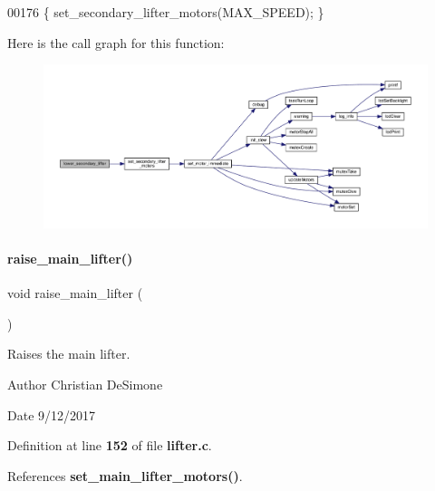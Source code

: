 \begin{DoxyCode}
00176 \{ set_secondary_lifter_motors(MAX\_SPEED); \}
\end{DoxyCode}
Here is the call graph for this function\+:
\nopagebreak
\begin{figure}[H]
\begin{center}
\leavevmode
\includegraphics[width=350pt]{lifter_8h_af76abbd394bf206ab56fa237d776f2b3_cgraph}
\end{center}
\end{figure}
\mbox{\label{lifter_8h_a2e2bd38b5b8b52378f3510368bf8aa0a}} 
\paragraph{raise\+\_\+main\+\_\+lifter()}
{\footnotesize\ttfamily void raise\+\_\+main\+\_\+lifter (\begin{DoxyParamCaption}{ }\end{DoxyParamCaption})}



Raises the main lifter. 

\begin{DoxyAuthor}{Author}
Christian De\+Simone 
\end{DoxyAuthor}
\begin{DoxyDate}{Date}
9/12/2017 
\end{DoxyDate}


Definition at line \textbf{ 152} of file \textbf{ lifter.\+c}.



References \textbf{ set\+\_\+main\+\_\+lifter\+\_\+motors()}.


